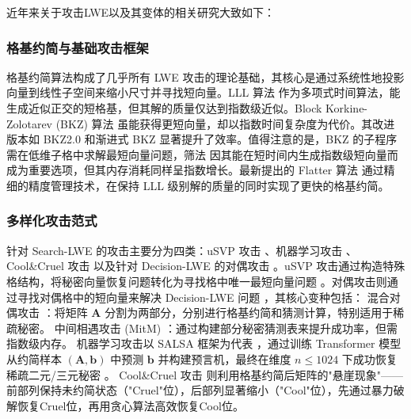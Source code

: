 \documentclass[12pt,a4paper]{article}
\numberwithin{equation}{section}
\begin{document}
近年来关于攻击LWE以及其变体的相关研究大致如下：
\subsubsection{格基约简与基础攻击框架}
格基约简算法构成了几乎所有 LWE 攻击的理论基础，其核心是通过系统性地投影向量到线性子空间来缩小尺寸并寻找短向量。LLL 算法 \cite{lenstra1982factoring} 作为多项式时间算法，能生成近似正交的短格基，但其解的质量仅达到指数级近似。Block Korkine-Zolotarev (BKZ) 算法 \cite{schnorr1987hierarchy} 虽能获得更短向量，却以指数时间复杂度为代价。其改进版本如 BKZ2.0 \cite{chen2011bkz} 和渐进式 BKZ \cite{aono2016improved,wang2022improved,xia2022improved} 显著提升了效率。值得注意的是，BKZ 的子程序需在低维子格中求解最短向量问题，筛法 \cite{albrecht2019general,ducas2021advanced} 因其能在短时间内生成指数级短向量而成为重要选项，但其内存消耗同样呈指数增长。最新提出的 Flatter 算法 \cite{ryan2023fast} 通过精细的精度管理技术，在保持 LLL 级别解的质量的同时实现了更快的格基约简。

\subsubsection{多样化攻击范式}
针对 Search-LWE 的攻击主要分为四类：uSVP 攻击 \cite{albrecht2021homomorphic}、机器学习攻击 \cite{stevens2024salsa}、Cool\&Cruel 攻击 \cite{nolte2024cool} 以及针对 Decision-LWE 的对偶攻击 \cite{albrecht2020faster,cheon2019hybrid}。uSVP 攻击通过构造特殊格结构，将秘密向量恢复问题转化为寻找格中唯一最短向量问题 \cite{albrecht2021homomorphic}。对偶攻击则通过寻找对偶格中的短向量来解决 Decision-LWE 问题 \cite{micciancio2009}，其核心变种包括：
混合对偶攻击 \cite{albrecht2017dual}：将矩阵 $\mathbf{A}$ 分割为两部分，分别进行格基约简和猜测计算，特别适用于稀疏秘密。
中间相遇攻击 (MitM) \cite{cheon2019hybrid}：通过构建部分秘密猜测表来提升成功率，但需指数级内存。
机器学习攻击以 SALSA 框架为代表 \cite{wenger2022salsa,stevens2024salsa,wengersalsa,li2023salsapicante}，通过训练 Transformer 模型从约简样本 $(\mathbf{A}, \mathbf{b})$ 中预测 $\mathbf{b}$ 并构建预言机，最终在维度 $n \leq 1024$ 下成功恢复稀疏二元/三元秘密 \cite{stevens2024salsa}。
Cool\&Cruel 攻击 \cite{nolte2024cool} 则利用格基约简后矩阵的"悬崖现象"——前部列保持未约简状态（"Cruel"位），后部列显著缩小（"Cool"位），先通过暴力破解恢复Cruel位，再用贪心算法高效恢复Cool位。
\end{document}
